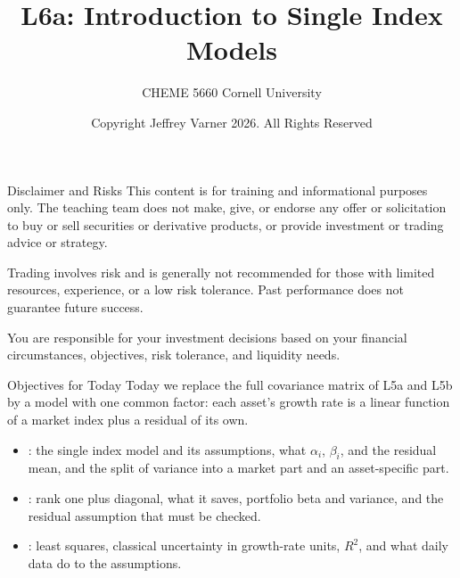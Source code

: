 \documentclass[aspectratio=169,11pt]{beamer}
\title{\texorpdfstring{{\vnheavy L6a}}{L6a}: Introduction to Single Index Models}
\subtitle{CHEME 5660 Cornell University}
\author{Copyright Jeffrey Varner 2026. All Rights Reserved}
\begin{document}
\vntitlepage

\begin{frame}{Disclaimer and Risks}
  \vspace{0.6em}
  \textbf{} This content is for training and informational
  purposes only. The teaching team does not make, give, or endorse any offer or
  solicitation to buy or sell securities or derivative products, or provide
  investment or trading advice or strategy.

  \vspace{1.1em}
  \textbf{} Trading involves risk and is generally not recommended for
  those with limited resources, experience, or a low risk tolerance. Past
  performance does not guarantee future success.

  \vspace{1.1em}
  \textbf{} You are responsible for your investment decisions
  based on your financial circumstances, objectives, risk tolerance, and
  liquidity needs.
\end{frame}

\begin{frame}{Objectives for Today}
  Today we replace the full covariance matrix of L5a and L5b by a model with one
  common factor: each asset's growth rate is a linear function of a market
  index plus a residual of its own.

  \vspace{0.6em}
  {\large\textbf{}}
  \vspace{0.2em}
  \begin{itemize}\setlength{\itemsep}{0.45em}
    \item {}: the single index model and
      its assumptions, what $\alpha_i$, $\beta_i$, and the residual mean, and the
      split of variance into a market part and an asset-specific part.
    \item {}: rank one plus diagonal,
      what it saves, portfolio beta and variance, and the residual assumption
      that must be checked.
    \item {}: least squares, classical
      uncertainty in growth-rate units, $R^2$, and what daily data do to the
      assumptions.
  \end{itemize}
\end{frame}
\end{document}
